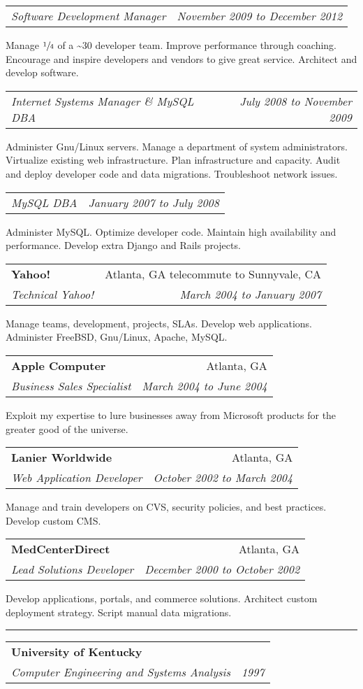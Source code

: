 \documentclass[10pt]{article}
\makeatletter
\newcounter{blocktitlechildren}
\newcommand{\blocktitle}[1]{
    \blocktitlechild{4mm}
    \setcounter{blocktitlechildren}{0}
    {{\sc{#1}\vspace{1.5mm}\hrule}\vspace*{1.5mm}}
}
\newcommand{\blocktitlechild}[2][]{
    \ifthenelse{\equal{\value{blocktitlechildren}}{0}}{}{\vspace{#2}#1}
    \addtocounter{blocktitlechildren}{1}
}
\newcommand{\sectionheader}[4]{
    \blocktitlechild{2mm}
    \begin{tabular*}{\textwidth}{l@{\extracolsep{\fill}}r}
    \textbf{#1} & #2\\
    \emph{#3} & \emph{#4}
    \end{tabular*}
}
\newcommand{\sectionsub}[2]{
    \blocktitlechild{1.4mm}
    \begin{tabular*}{\textwidth}{l@{\extracolsep{\fill}}r}
    \emph{#1} & \emph{#2}
    \end{tabular*}
}
\newenvironment{longtext}[1]{\small {#1}}
\makeatother
\begin{document}
\sectionsub
{Software Development Manager}
{November 2009 to December 2012}
\begin{longtext}
Manage $\sfrac{1}{4}$ of a \~{}30 developer team.
Improve performance through coaching.
Encourage and inspire developers and vendors to give great service.
Architect and develop software.
\end{longtext}
\sectionsub
{Internet Systems Manager \& MySQL DBA}
{July 2008 to November 2009}
\begin{longtext}
Administer Gnu/Linux servers.
Manage a department of system administrators.
Virtualize existing web infrastructure.
Plan infrastructure and capacity.
Audit and deploy developer code and data migrations.
Troubleshoot network issues.
\end{longtext}
\sectionsub
{MySQL DBA}
{January 2007 to July 2008}
\begin{longtext}
Administer MySQL.
Optimize developer code.
Maintain high availability and performance.
Develop extra Django and Rails projects.
\end{longtext}

\sectionheader
{Yahoo!}{Atlanta, GA telecommute to Sunnyvale, CA}
{Technical Yahoo!}
{March 2004 to January 2007}
\begin{longtext}
Manage teams, development, projects, SLAs.
Develop web applications.
Administer FreeBSD, Gnu/Linux, Apache, MySQL.
\end{longtext}

\sectionheader
{Apple Computer}{Atlanta, GA}
{Business Sales Specialist}
{March 2004 to June 2004}
\begin{longtext}
Exploit my expertise to lure businesses away from Microsoft products for the greater good of the universe.
\end{longtext}

\sectionheader
{Lanier Worldwide}{Atlanta, GA}
{Web Application Developer}
{October 2002 to March 2004}
\begin{longtext}
Manage and train developers on CVS, security policies, and best practices.
Develop custom CMS.
\end{longtext}

\sectionheader
{MedCenterDirect}{Atlanta, GA}
{Lead Solutions Developer}
{December 2000 to October 2002}
\begin{longtext}
Develop applications, portals, and commerce solutions.
Architect custom deployment strategy.
Script manual data migrations.
\end{longtext}

\blocktitle{Education}
\sectionheader
{University of Kentucky}{}
{Computer Engineering and Systems Analysis}
{1997}
\end{document}
